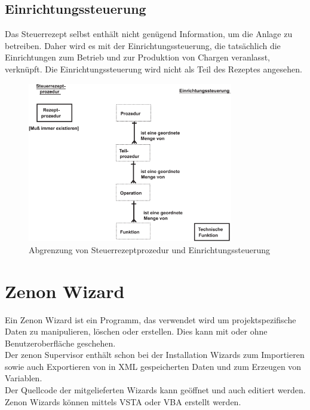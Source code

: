 \subsection{Einrichtungssteuerung}
Das Steuerrezept selbst enthält nicht genügend Information, um die Anlage zu betreiben. Daher wird es mit der Einrichtungssteuerung, die tatsächlich die Einrichtungen zum Betrieb und zur Produktion von Chargen veranlasst, verknüpft. Die Einrichtungssteuerung wird nicht als Teil des Rezeptes angesehen.
\begin{figure}[h!]
		\centering
		\includegraphics[width=0.8\textwidth]{graphics/stateoftheart/steuerrezeptprozedur_einrichtungssteuerung.png}
		\caption{Abgrenzung von Steuerrezeptprozedur und Einrichtungssteuerung \cite{en61512}}
\end{figure}


\section{Zenon Wizard}
Ein Zenon Wizard ist ein Programm, das verwendet wird um projektspezifische Daten zu manipulieren, löschen oder erstellen. Dies kann mit oder ohne Benutzeroberfläche geschehen.\\
Der zenon Supervisor enthält schon bei der Installation Wizards zum Importieren sowie auch Exportieren von in XML gespeicherten Daten und zum Erzeugen von Variablen.\\
Der Quellcode der mitgelieferten Wizards kann geöffnet und auch editiert werden. Zenon Wizards können mittels VSTA oder VBA erstellt werden. \cite{zenprog}

